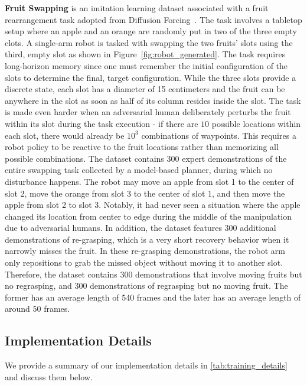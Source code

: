 \textbf{Fruit Swapping} is an imitation learning dataset associated with a fruit rearrangement task adopted from Diffusion Forcing~\cite{chen2024diffusion}. The task involves a tabletop setup where an apple and an orange are randomly put in two of the three empty clots. A single-arm robot is tasked with swapping the two fruits' slots using the third, empty slot as shown in Figure~\ref{fig:robot_generated}. The task requires long-horizon memory since one must remember the initial configuration of the slots to determine the final, target configuration. While the three slots provide a discrete state, each slot has a diameter of 15 centimeters and the fruit can be anywhere in the slot as soon as half of its column resides inside the slot. The task is made even harder when an adversarial human deliberately perturbs the fruit within its slot during the task execution - if there are $10$ possible locations within each slot, there would already be $10^3$ combinations of waypoints. This requires a robot policy to be reactive to the fruit locations rather than memorizing all possible combinations. The dataset contains $300$ expert demonstrations of the entire swapping task collected by a model-based planner, during which no disturbance happens. The robot may move an apple from slot 1 to the center of slot 2, move the orange from slot 3 to the center of slot 1, and then move the apple from slot 2 to slot 3. Notably, it had never seen a situation where the apple changed its location from center to edge during the middle of the manipulation due to adversarial humans. In addition, the dataset features $300$ additional demonstrations of re-grasping, which is a very short recovery behavior when it narrowly misses the fruit. In these re-grasping demonstrations, the robot arm only repositions to grab the missed object without moving it to another slot. Therefore, the dataset contains $300$ demonstrations that involve moving fruits but no regrasping, and $300$ demonstrations of regrasping but no moving fruit. The former has an average length of 540 frames and the later has an average length of around 50 frames.

\subsection{Implementation Details}



We provide a summary of our implementation details in \cref{tab:training_details} and discuss them below.

